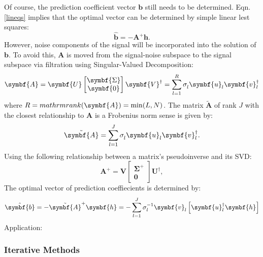 Of course, the prediction coefficient vector $\symbf{b}$ still needs to be determined. Eqn. \ref{lineqs} implies that the optimal vector can be determined by simple linear lest squares:
\begin{equation}
  \hat{\symbf{b}} = - \mathbf{A}^+ \symbf{h}.
\end{equation}
However, noise components of the signal will be incorporated into the solution of $\symbf{b}$. To avoid this, $\symbf{A}$ is moved from the signal-noise subspace to the signal subspace via filtration using Singular-Valued Decomposition:
\begin{equation}
  \symbf{A} = \symbf{U}
  \begin{bmatrix}
    \symbf{\Sigma}\\
    \symbf{0}
  \end{bmatrix}
  \symbf{V}^{\dagger} = \sum_{l=1}^R \sigma_l^{\vphantom{\dagger}} \symbf{u}_l^{\vphantom{\dagger}} \symbf{v}_l^{\dagger}
\end{equation}
where $R = \\mathrm{rank}(\symbf{A}) = \min(L, N)$. The matrix $\tilde{\symbf{A}}$ of rank $J$ with the closest relationship to $\symbf{A}$ is a Frobenius norm sense is given by\cite{Cadzow1988}:
\begin{equation}
  \tilde{\symbf{A}} = \sum_{l=1}^J \sigma_l^{\vphantom{\dagger}} \symbf{u}_l^{\vphantom{\dagger}} \symbf{v}_l^{\dagger}.
\end{equation}
Using the following relationship between a matrix's pseudoinverse and its SVD:
\begin{equation}
  \symbf{A}^+ = \symbf{V}
  \begin{bmatrix}
    \symbf{\Sigma}^+\\
    \symbf{0}
  \end{bmatrix}
  \symbf{U}^{\dagger},
\end{equation}
The optimal vector of prediction coeffiecients is determined by:
\begin{equation}
  \hat{\symbf{b}} = - \tilde{\symbf{A}}^+ \symbf{h} = - \sum_{l=1}^J \sigma_l^{-1 \vphantom{\dagger}} \symbf{v}_l^{\vphantom{\dagger}} \left[ \symbf{u}_l^{\dagger} \symbf{h} \right]
\end{equation}
Application: \cite{Barkhuijsen1985}


\subsubsection{Iterative Methods}

